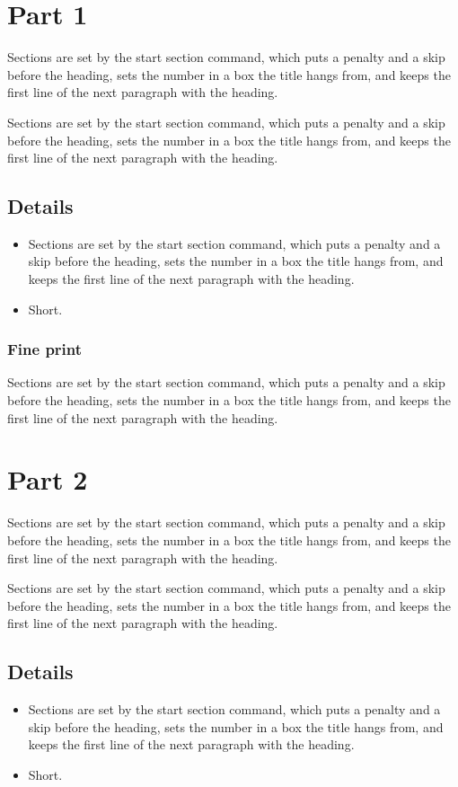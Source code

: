 \documentclass[12pt]{report}
\begin{document}
\section{Part 1}
Sections are set by the start section command, which puts a penalty and a skip before the heading, sets the number in a box the title hangs from, and keeps the first line of the next paragraph with the heading.

Sections are set by the start section command, which puts a penalty and a skip before the heading, sets the number in a box the title hangs from, and keeps the first line of the next paragraph with the heading.
\subsection{Details}
\begin{itemize}
\item Sections are set by the start section command, which puts a penalty and a skip before the heading, sets the number in a box the title hangs from, and keeps the first line of the next paragraph with the heading.
\item Short.
\end{itemize}
\subsubsection{Fine print}
Sections are set by the start section command, which puts a penalty and a skip before the heading, sets the number in a box the title hangs from, and keeps the first line of the next paragraph with the heading.

\section{Part 2}
Sections are set by the start section command, which puts a penalty and a skip before the heading, sets the number in a box the title hangs from, and keeps the first line of the next paragraph with the heading.

Sections are set by the start section command, which puts a penalty and a skip before the heading, sets the number in a box the title hangs from, and keeps the first line of the next paragraph with the heading.
\subsection{Details}
\begin{itemize}
\item Sections are set by the start section command, which puts a penalty and a skip before the heading, sets the number in a box the title hangs from, and keeps the first line of the next paragraph with the heading.
\item Short.
\end{itemize}
\end{document}
